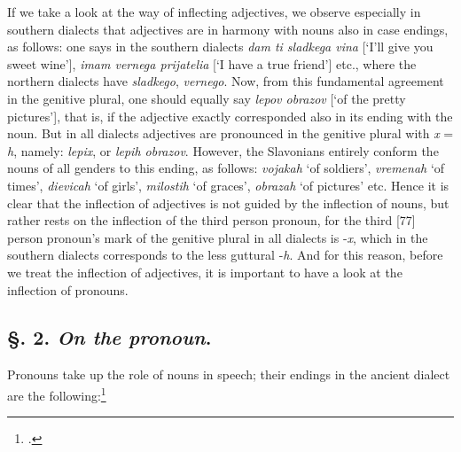 If we take a look at the way of inflecting adjectives, we observe especially in southern dialects that adjectives are in harmony with nouns also in case endings, as follows: one says in the southern dialects \textit{dam ti sladkega vina} [‘I’ll give you sweet wine’], \textit{imam vernega prijatelia} [‘I have a true friend’] etc., where the northern dialects have \textit{sladkego}, \textit{vernego}. Now, from this fundamental agreement in the genitive plural, one should equally say \textit{lepov obrazov} [‘of the pretty pictures’], that is, if the adjective exactly corresponded also in its ending with the noun. But in all dialects adjectives are pronounced in the genitive plural with \textit{x} = \textit{h}, namely: \textit{lepix}, or \textit{lepih obrazov}. However, the Slavonians entirely conform the nouns of all genders to this ending, as follows: \textit{vojakah} ‘of soldiers’, \textit{vremenah} ‘of times’, \textit{dievicah} ‘of girls’, \textit{milostih} ‘of graces’, \textit{obrazah} ‘of pictures’ etc. Hence it is clear that the inflection of adjectives is not guided by the inflection of nouns, but rather rests on the inflection of the third person pronoun, for the third [77] person pronoun’s mark of the genitive plural in all dialects is -\textit{x}, which in the southern dialects corresponds to the less guttural -\textit{h}. And for this reason, before we treat the inflection of adjectives, it is important to have a look at the inflection of pronouns.

\subsection*{\hspace*{\fill}§. 2. \textit{On the pronoun}.\hspace*{\fill}}

Pronouns take up the role of nouns in speech; their endings in the ancient dialect are the following:{\enlargethispage{\baselineskip}\footnote{\citet[490--497]{dobrovsky_institutiones_1822}.}}


